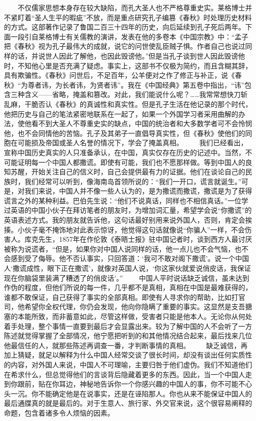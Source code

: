 \documentclass[12pt,oneside]{book}
\begin{document}
\begin{common-format}
　　不仅儒家思想本身存在较大缺陷，而孔大圣人也不严格尊重史实。莱格博士并不紧盯着“圣人生平的暇疵”不放，而是重点研究孔子编篡《春秋》时处理历史材料的方式。这部著作记录了鲁国二百三十四年的历史，向后延续到孔子死后两年。下面一段引自莱格博士有关儒教的演讲，发表在他的多卷本《中国宗教》中：“孟子把《春秋》视为孔子最伟大的成就，说它的问世使乱臣贼子惧。作者自己也说过同样的话，并说世人因此了解他，也因此毁谤他。”但是当孔子谈到世人因此毁谤他时，不知他心里是否充满了疑虑。事实上，这部书不仅极为简约，而且含糊其辞，具有欺骗性。《春秋》问世后，不足百年，公羊便对之作了修正与补正，说《春秋》“为尊者讳，为长者讳，为贤者讳”。我在《中国经典》第五卷中指出，“讳”包含三种含义——省略，掩盖和篡改。对此，我们能说什么呢？……我常常想快刀斩乱麻，干脆否认《春秋》的真诚性和真实性。但是孔子生活在他记录的那个时代，他把历史与自己的笔法紧密地联系在一起了，如果一个外国学习者采用曲解的办法，使他看不到大圣人不尊重史实的缺点，中国的统治者和大多数学者可不会怜悯他，也不会同情他的苦恼。孔子及其弟子一直倡导真实性，但《春秋》使他们的同胞在可能损及帝国或圣人名誉的情况下，学会了掩盖真相。 
　　我们已经看出，宣称中国历史真实的人只准备承认，在中国，真实仅存在历史的记述中。当然，不可能证明每一个中国人都撒谎。即使有可能，我们也不愿那样做。等到中国人的良知苏醒，开始关注自己的信义时，自己会提供最有力的证据。他们在谈论自己的民族时，我们经常可以听到，像海南岛首领所说的：“我们一开口，谎言就诞生。”可是，对我们来说，中国人并不像一些人认为的，是为撒谎而撒谎，撒谎是为了获得谎言之外的某种利益。巴伯先生说：“他们不说真话，同样也不相信真话。”一位学过英语的中国小伙子在拜访笔者的朋友时，为增加词汇量，希望学会说“你撒谎”的英语表述方式。我的朋友就告诉他，这句话最好别用来说外国人，否则，肯定会挨揍。小伙子毫不掩饰地对此表示惊讶，他觉得这句话就像说“你骗人”一样，不会伤害人。库克先生，1857年在作伦敦《泰晤士报》驻中国记者时，谈到西方人最讨厌被称为说谎者，“但是，如果你对中国人说同样的话，他一点儿也不会气恼，也不会感到受了侮辱。他不否认事实，只回答道：‘我可不敢对阁下撒谎’。说一个中国人‘撒谎成性，眼下正在撒谎’，就像对英国人说，‘你这家伙就爱说俏皮话，我保证现在你脑袋里装满了糟透了的俏皮话’。” 
　　中国人平时说话缺乏诚信，虽未达到作伪的程度，但他们所说的每一件，几乎都不是真相，真相在中国是最难获得的，谁都不敢保证，自己获得了事实的全部真相。即使有人寻求你的帮助，比如打官司，他希望你全权代理，你仍会发现，他向你隐瞒了重要的事实。这显然是支吾搪塞的本能所致，而非蓄意如此，尽管这样做，受害者只能是他本人。无论你从何处着手处理，整个事情一直要到最后才会显露出来。较为了解中国的人不会听了一方陈述就觉得掌握了全部情况，他宁愿把听到的和其他情况结合起来，最后找来几位他最信任的人，就那些陈述再调查一番，才判断事情的真相。 
　　缺乏诚信，再加上猜疑，就足以解释为什么中国人经常交谈了很长时间，却没有谈出任何实质性的内容，对外国人来说，中国人不可理喻，主要归咎于他们虚伪。我们不知道他们在希求什么，但总觉得他们的言谈背后隐藏着更多的东西。因此，当一个中国人走到你跟前，贴在你耳边，神秘地告诉你一个你感兴趣的中国人的事，你不可能不心头一沉。你不能确定他是在说事实，还是在诬陷那人。你也从来不能保证中国人的最后通牒真的就是最后的。对于生意人、旅行家、外交官来说，这个很容易阐释的命题，包含着诸多令人烦恼的因素。 

\end{common-format}
\end{document}
